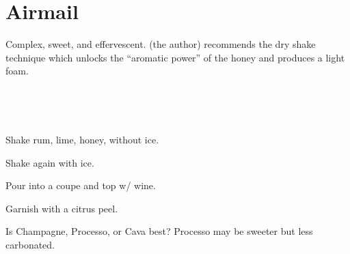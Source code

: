 \section[Airmail]{Airmail}

\begin{recipestats}[
        servings=1,
        preptime=5~\minute,
        original=\citefield{cocktailSeminars2021}{title} \cite{cocktailSeminars2021},
    ]
\end{recipestats}


\begin{recipeabstract}
    Complex, sweet, and effervescent.
    \citeauthor{cocktailSeminars2021} (the author) recommends the dry shake
    technique which unlocks the ``aromatic power'' of the honey and produces
    a light foam.
\end{recipeabstract}

\begin{ingredientcolumns}
    \begin{ingredientblock}
        \\
    \end{ingredientblock}
    \begin{ingredientblock}
        \\
    \end{ingredientblock}
\end{ingredientcolumns}

\begin{preparation}
\item Shake rum, lime, honey, without ice.
\item Shake again with ice.
\item Pour into a coupe and top w/ wine.
\item Garnish with a citrus peel.
\end{preparation}

\begin{experiments}
\item Is Champagne, Processo, or Cava best?
    Processo may be sweeter but less carbonated.
\end{experiments}

\recipeend
